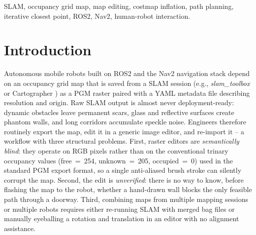 \documentclass[journal]{IEEEtran}
\begin{document}
\begin{IEEEkeywords}
SLAM, occupancy grid map, map editing, costmap inflation, path planning, iterative closest point, ROS2, Nav2, human-robot interaction.
\end{IEEEkeywords}

\section{Introduction}
Autonomous mobile robots built on ROS2 and the Nav2 navigation stack \cite{macenski2020marathon} depend on an occupancy grid map that is saved from a SLAM session (e.g., \emph{slam\_toolbox} \cite{macenski2021slamtoolbox} or Cartographer \cite{hess2016cartographer}) as a PGM raster paired with a YAML metadata file describing resolution and origin. Raw SLAM output is almost never deployment-ready: dynamic obstacles leave permanent scars, glass and reflective surfaces create phantom walls, and long corridors accumulate speckle noise. Engineers therefore routinely export the map, edit it in a generic image editor, and re-import it -- a workflow with three structural problems. First, raster editors are \emph{semantically blind}: they operate on RGB pixels rather than on the conventional trinary occupancy values (free~=~254, unknown~=~205, occupied~=~0) used in the standard PGM export format, so a single anti-aliased brush stroke can silently corrupt the map. Second, the edit is \emph{unverified}: there is no way to know, before flashing the map to the robot, whether a hand-drawn wall blocks the only feasible path through a doorway. Third, combining maps from multiple mapping sessions or multiple robots requires either re-running SLAM with merged bag files or manually eyeballing a rotation and translation in an editor with no alignment assistance.
\end{document}
